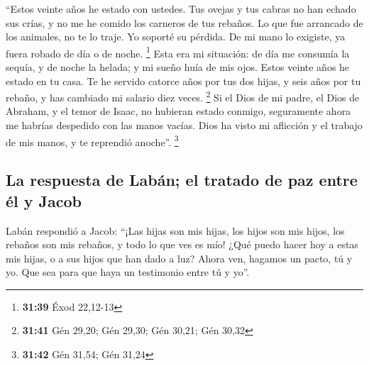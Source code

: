  ``Estos veinte años he estado con ustedes. Tus ovejas y
tus cabras no han echado sus crías, y no me he comido los carneros de
tus rebaños.  Lo que fue arrancado de los animales, no te
lo traje. Yo soporté su pérdida. De mi mano lo exigiste, ya fuera robado
de día o de noche. \footnote{\textbf{31:39} Éxod 22,12-13}
 Esta era mi situación: de día me consumía la sequía, y
de noche la helada; y mi sueño huía de mis ojos.  Estos
veinte años he estado en tu casa. Te he servido catorce años por tus dos
hijas, y seis años por tu rebaño, y has cambiado mi salario diez veces.
\footnote{\textbf{31:41} Gén 29,20; Gén 29,30; Gén 30,21; Gén 30,32}
 Si el Dios de mi padre, el Dios de Abraham, y el temor
de Isaac, no hubieran estado conmigo, seguramente ahora me habrías
despedido con las manos vacías. Dios ha visto mi aflicción y el trabajo
de mis manos, y te reprendió anoche''. \footnote{\textbf{31:42} Gén
  31,54; Gén 31,24}

\hypertarget{la-respuesta-de-labuxe1n-el-tratado-de-paz-entre-uxe9l-y-jacob}{%
\subsection{La respuesta de Labán; el tratado de paz entre él y
Jacob}\label{la-respuesta-de-labuxe1n-el-tratado-de-paz-entre-uxe9l-y-jacob}}

 Labán respondió a Jacob: ``¡Las hijas son mis hijas, los
hijos son mis hijos, los rebaños son mis rebaños, y todo lo que ves es
mío! ¿Qué puedo hacer hoy a estas mis hijas, o a sus hijos que han dado
a luz?  Ahora ven, hagamos un pacto, tú y yo. Que sea
para que haya un testimonio entre tú y yo''.

